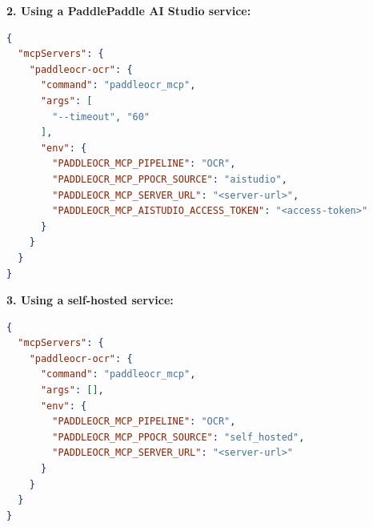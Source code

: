 \documentclass[11pt, a4paper, logo, copyright, nonumbering]{paddleocr}
\begin{document}
\textbf{2. Using a PaddlePaddle AI Studio service:}

\begin{lstlisting}[language=json]
{
  "mcpServers": {
    "paddleocr-ocr": {
      "command": "paddleocr_mcp",
      "args": [
        "--timeout", "60"
      ],
      "env": {
        "PADDLEOCR_MCP_PIPELINE": "OCR",
        "PADDLEOCR_MCP_PPOCR_SOURCE": "aistudio",
        "PADDLEOCR_MCP_SERVER_URL": "<server-url>", 
        "PADDLEOCR_MCP_AISTUDIO_ACCESS_TOKEN": "<access-token>"
      }
    }
  }
}
\end{lstlisting}

\textbf{3. Using a self-hosted service:}

\begin{lstlisting}[language=json]
{
  "mcpServers": {
    "paddleocr-ocr": {
      "command": "paddleocr_mcp",
      "args": [],
      "env": {
        "PADDLEOCR_MCP_PIPELINE": "OCR",
        "PADDLEOCR_MCP_PPOCR_SOURCE": "self_hosted",
        "PADDLEOCR_MCP_SERVER_URL": "<server-url>"
      }
    }
  }
}
\end{lstlisting}

\setcounter{figure}{0}
\makeatletter 
\renewcommand{\thefigure}{A\@arabic\c@figure}
\makeatother

\setcounter{table}{0}
\makeatletter 
\renewcommand{\thetable}{A\@arabic\c@table}
\makeatother
\end{document}

